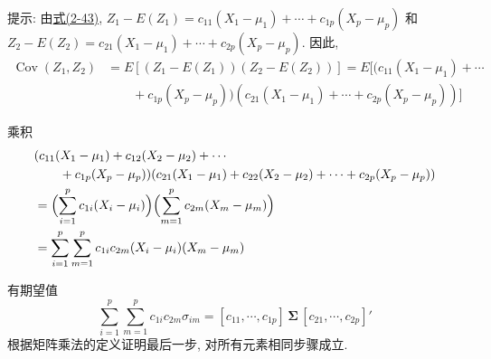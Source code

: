 \noindent 提示: 由\hyperref[eq:2-43]{式(2-43)}, $Z_{1}-E(Z_{1})=c_{11}(X_{1}-\mu_{1})+\cdots+c_{1p}(X_{p}-\mu_{p})$ 和 $Z_{2}-E(Z_{2})=c_{21}(X_{1}-\mu_{1})+\cdots+c_{2p}(X_{p}-\mu_{p})$. 因此,
\begin{align*}
\operatorname{Cov}(Z_{1},Z_{2})&=E[(Z_{1}-E(Z_{1}))(Z_{2}-E(Z_{2}))]=E[(c_{11}(X_{1}-\mu_{1})+\cdots\\
&\qquad+c_{1p}(X_{p}-\mu_{p}))(c_{21}(X_{1}-\mu_{1})+\cdots+c_{2p}(X_{p}-\mu_{p}))]
\end{align*}

\noindent 乘积
\begin{align*}
&(c_{11}(X_{1}-\mu_{1})+c_{12}(X_{2}-\mu_{2})+\cdots\\
&\qquad+c_{1p}(X_{p}-\mu_{p}))(c_{21}(X_{1}-\mu_{1})+c_{22}(X_{2}-\mu_{2})+\cdots+c_{2p}(X_{p}-\mu_{p}))\\
&=\Bigl(\sum_{i=1}^{p}c_{1i}(X_{i}-\mu_{i})\Bigr)\Bigl(\sum_{m=1}^{p}c_{2m}(X_{m}-\mu_{m})\Bigr)\\
&=\sum_{i=1}^{p}\sum_{m=1}^{p}c_{1i}c_{2m}(X_{i}-\mu_{i})(X_{m}-\mu_{m})
\end{align*}

\noindent 有期望值
\[
\sum_{i=1}^{p}\sum_{m=1}^{p}c_{1i}c_{2m}\sigma_{im}=[c_{11},\cdots,c_{1p}]\,\boldsymbol{\Sigma}\,[c_{21},\cdots,c_{2p}]'
\]
根据矩阵乘法的定义证明最后一步, 对所有元素相同步骤成立.
